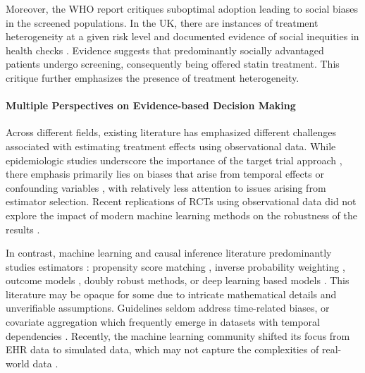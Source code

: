 \documentclass[10pt,letterpaper]{article}
\begin{document}
Moreover, the WHO report critiques suboptimal adoption leading to social biases in the screened populations. In the UK, there are instances of treatment heterogeneity at a given risk level \cite{van2013efficiency} and documented evidence of social inequities in health checks \cite{krska2016implementation}. Evidence suggests that predominantly socially advantaged patients undergo screening, consequently being offered statin treatment. This critique further emphasizes the presence of treatment heterogeneity.


\paragraph{Multiple Perspectives on Evidence-based Decision Making}
Across different fields, existing literature has emphasized different challenges associated
with estimating treatment effects using observational data. While epidemiologic
studies underscore the importance of the target trial approach
\cite{von2007strengthening,benchimol2015reporting,hernan2020causal,schneeweiss2021conducting,zeng2022uncovering},
there emphasis primarily lies on biases that arise from temporal effects \cite{suissa2008immortal,Oke2021leadtimebias,fu2021timing,hernan2016specifying,wang2022understanding,Bankhead2017attritionbias} or confounding variables \cite{greenland1999causal,vanderweele2019principles,loh2021confounder}, with
relatively less attention to issues arising from estimator selection.
Recent replications of RCTs using observational data did not explore the impact
of modern machine learning methods on the robustness of the results
\cite{schneeweiss2021conducting,wang2023emulation}.

In contrast, machine learning and causal inference literature predominantly
studies estimators
\cite{belloni2014high,chernozhukov2018double,shalit2016tutorial,sharma2018tutorial,moraffah2021causal}
: propensity score matching \cite{stuart2010matching}, inverse probability
weighting \cite{austin2015moving}, outcome models \cite{robins1986role}, doubly
robust methods, \cite{chernozhukov2018double} or deep learning based models
\cite{johansson2022generalization}. This literature may be opaque for some due to intricate mathematical details and unverifiable assumptions. Guidelines seldom
address time-related biases, or covariate aggregation which
frequently emerge in datasets with temporal dependencies
\cite{suissa2008immortal,fu2021timing}. Recently, the machine learning community
shifted its focus from EHR data to simulated data, which may not capture the
complexities of real-world data \cite{schuler2017targeted,dorie2019automated,
  alaa2019validating, curth2021really}.
\end{document}
